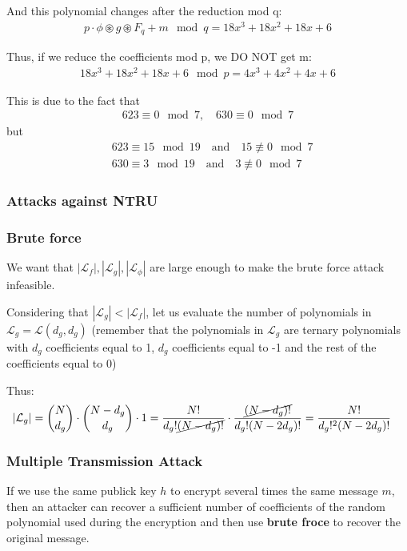 \noindent
And this polynomial changes after the reduction mod q:
\begin{align*}
    p \cdot \phi \circledast g \circledast F_q + m \mod q = 18x^3 + 18x^2 + 18x + 6
\end{align*}

\noindent
Thus, if we reduce the coefficients mod p, we DO NOT get m:
\begin{align*}
    18x^3 + 18x^2 + 18x + 6 \mod p = 4x^3 + 4x^2 + 4x + 6
\end{align*}
\medskip

\noindent
This is due to the fact that
\begin{align*}
    623 \equiv 0 \mod 7, \quad 630 \equiv 0 \mod 7
\end{align*}
\noindent
but
\begin{align*}
    &623 \equiv 15 \mod 19 \quad \text{and} \quad 15 \not\equiv 0 \mod 7\\
    &630 \equiv 3 \mod 19 \quad \text{and} \quad 3 \not\equiv 0 \mod 7
\end{align*} 
 
\subsubsection{Attacks against NTRU}

\subsubsection*{Brute force}
We want that  $|\mathcal{L}_f|, |\mathcal{L}_g|, |\mathcal{L}_\phi|$ are large enough to make the brute force attack infeasible.
\medskip

\noindent
Considering that $|\mathcal{L}_g| < |\mathcal{L}_f|$, let us evaluate the number of polynomials in $\mathcal{L}_g = \mathcal{L}(d_g, d_g)$ (remember that the polynomials in $\mathcal{L}_g$  are ternary polynomials with $d_g$ coefficients equal to 1, $d_g$ coefficients equal to -1 and the rest of the coefficients equal to 0)
\medskip

\noindent
Thus:
\begin{align*}
    |\mathcal{L}_g| &= \binom{N}{d_g} \cdot \binom{N-d_g}{d_g} \cdot 1 = \frac{N!}{d_g! \cancel{(N-d_g) !}} \cdot \frac{\cancel{(N-d_g)!}}{d_g! (N-2d_g)!} = \frac{N!}{d_g!^2 (N-2d_g)!}
\end{align*}
\vspace{0.5 cm}

\subsubsection*{Multiple Transmission Attack}
If we use the same publick key $h$ to encrypt several times the same message $m$, then an attacker can recover a sufficient number of coefficients of the random polynomial used during the encryption and then use \textbf{brute froce} to recover the original message.
\medskip

